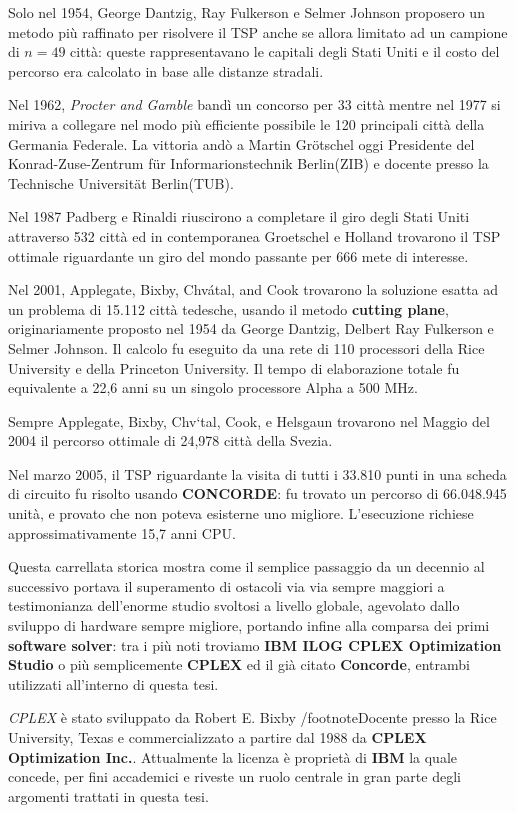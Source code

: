 \documentclass[11pt]{article}
\begin{document}
Solo nel 1954, George Dantzig, Ray Fulkerson e Selmer Johnson proposero un metodo più raffinato per risolvere il TSP anche se allora limitato ad un campione di $n = 49$ città: queste rappresentavano le capitali degli Stati Uniti e il costo del percorso era calcolato in base alle distanze stradali.

Nel 1962, \textit{Procter and Gamble} bandì un concorso per 33 città mentre nel 1977 si miriva a collegare nel modo più efficiente possibile le 120 principali città della Germania Federale. La vittoria andò a Martin Gr\"otschel oggi Presidente del Konrad-Zuse-Zentrum f\"ur Informarionstechnik Berlin(ZIB) e docente presso la Technische Universit\"at Berlin(TUB).

Nel 1987 Padberg e Rinaldi riuscirono a completare il giro degli Stati Uniti attraverso 532 città ed in contemporanea Groetschel e Holland trovarono il TSP ottimale riguardante un giro del mondo passante per 666 mete di interesse.

Nel 2001, Applegate, Bixby, Chvátal, and Cook trovarono la soluzione esatta ad un problema di 15.112 città tedesche, usando il metodo \textbf{cutting plane}, originariamente proposto nel 1954 da George Dantzig, Delbert Ray Fulkerson e Selmer Johnson. Il calcolo fu eseguito da una rete di 110 processori della Rice University e della Princeton University. Il tempo di elaborazione totale fu equivalente a 22,6 anni su un singolo processore Alpha a 500 MHz.

Sempre Applegate, Bixby, Chv\a`tal, Cook, e Helsgaun trovarono nel Maggio del 2004 il percorso ottimale di 24,978 città della Svezia.

Nel marzo 2005, il TSP riguardante la visita di tutti i 33.810 punti in una scheda di circuito fu risolto usando \textbf{CONCORDE}: fu trovato un percorso di 66.048.945 unità, e provato che non poteva esisterne uno migliore. L'esecuzione richiese approssimativamente 15,7 anni CPU.

Questa carrellata storica mostra come il semplice passaggio da un decennio al successivo portava il superamento di ostacoli via via sempre maggiori a testimonianza dell'enorme studio svoltosi a livello globale, agevolato dallo sviluppo di hardware sempre migliore, portando infine alla comparsa dei primi \textbf{software solver}: tra i più noti troviamo \textbf{IBM ILOG CPLEX Optimization Studio} o più semplicemente \textbf{CPLEX} ed il già citato \textbf{Concorde}, entrambi utilizzati all'interno di questa tesi.

\textit{CPLEX} è stato sviluppato da Robert E. Bixby /footnote{Docente presso la Rice University, Texas} e commercializzato a partire dal 1988 da \textbf{CPLEX Optimization Inc.}. Attualmente la licenza è proprietà di \textbf{IBM} la quale concede, per fini accademici e riveste un ruolo centrale in gran parte degli argomenti trattati in questa tesi.
\end{document}
